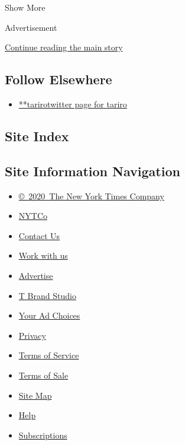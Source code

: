 Show More

Advertisement

\protect\hyperlink{after-mid2}{Continue reading the main story}

\hypertarget{follow-elsewhere}{%
\subsection{Follow Elsewhere}\label{follow-elsewhere}}

\begin{itemize}
\tightlist
\item
  \href{https://twitter.com/tariro}{**tarirotwitter page for tariro}
\end{itemize}

\hypertarget{site-index}{%
\subsection{Site Index}\label{site-index}}

\hypertarget{site-information-navigation}{%
\subsection{Site Information
Navigation}\label{site-information-navigation}}

\begin{itemize}
\tightlist
\item
  \href{https://help.nytimes3xbfgragh.onion/hc/en-us/articles/115014792127-Copyright-notice}{©~2020~The
  New York Times Company}
\end{itemize}

\begin{itemize}
\tightlist
\item
  \href{https://www.nytco.com/}{NYTCo}
\item
  \href{https://help.nytimes3xbfgragh.onion/hc/en-us/articles/115015385887-Contact-Us}{Contact
  Us}
\item
  \href{https://www.nytco.com/careers/}{Work with us}
\item
  \href{https://nytmediakit.com/}{Advertise}
\item
  \href{http://www.tbrandstudio.com/}{T Brand Studio}
\item
  \href{https://www.nytimes3xbfgragh.onion/privacy/cookie-policy\#how-do-i-manage-trackers}{Your
  Ad Choices}
\item
  \href{https://www.nytimes3xbfgragh.onion/privacy}{Privacy}
\item
  \href{https://help.nytimes3xbfgragh.onion/hc/en-us/articles/115014893428-Terms-of-service}{Terms
  of Service}
\item
  \href{https://help.nytimes3xbfgragh.onion/hc/en-us/articles/115014893968-Terms-of-sale}{Terms
  of Sale}
\item
  \href{https://spiderbites.nytimes3xbfgragh.onion}{Site Map}
\item
  \href{https://help.nytimes3xbfgragh.onion/hc/en-us}{Help}
\item
  \href{https://www.nytimes3xbfgragh.onion/subscription?campaignId=37WXW}{Subscriptions}
\end{itemize}
